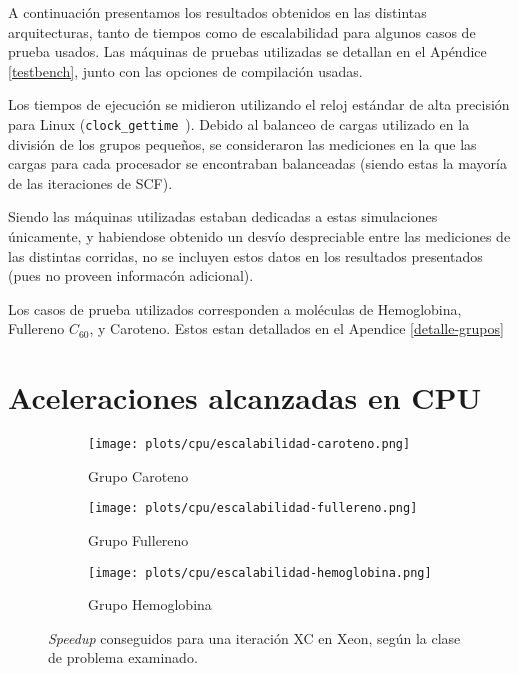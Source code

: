 A continuaci\'on presentamos los resultados obtenidos en las distintas arquitecturas, tanto
de tiempos como de escalabilidad para algunos casos de prueba usados. Las m\'aquinas de pruebas
utilizadas se detallan en el Apéndice \ref{testbench}, junto con las opciones de compilaci\'on usadas.

Los tiempos de ejecuci\'on se midieron utilizando el reloj est\'andar de alta
precisi\'on para Linux (\texttt{clock\_gettime}~\cite{LinuxDocumentation}). Debido al
balanceo de cargas utilizado en la divisi\'on de los grupos peque\~nos, se consideraron
las mediciones en la que las cargas para cada procesador se encontraban balanceadas
(siendo estas la mayor\'ia de las iteraciones de SCF).

Siendo las m\'aquinas utilizadas estaban dedicadas a estas simulaciones \'unicamente,
y habiendose obtenido un desv\'io despreciable entre las mediciones de las distintas
corridas, no se incluyen estos datos en los resultados presentados (pues no proveen
informac\'on adicional).

Los casos de prueba utilizados corresponden a mol\'eculas de Hemoglobina, Fullereno $C_{60}$,
y Caroteno. Estos estan detallados en el Apendice \ref{detalle-grupos}

\section{Aceleraciones alcanzadas en CPU}

\begin{figure}[htbp]
\centering
\begin{subfigure}[b]{\plotwidthtres}
   \texttt{[image: plots/cpu/escalabilidad-caroteno.png]}
   \caption{Grupo Caroteno}
   \label{fig:cpu-scalability-caroteno}
 \end{subfigure}
\begin{subfigure}[b]{\plotwidthtres}
   \texttt{[image: plots/cpu/escalabilidad-fullereno.png]}
   \caption{Grupo Fullereno}
   \label{fig:cpu-scalability-fullereno}
 \end{subfigure}
\begin{subfigure}[b]{\plotwidthtres}
   \texttt{[image: plots/cpu/escalabilidad-hemoglobina.png]}
   \caption{Grupo Hemoglobina}
   \label{fig:cpu-scalability-hemo}
 \end{subfigure}
 \caption{\textit{Speedup} conseguidos para una iteraci\'on XC en Xeon, seg\'un
 la clase de problema examinado.}
 \label{fig:cpu-scalability}
\end{figure}


